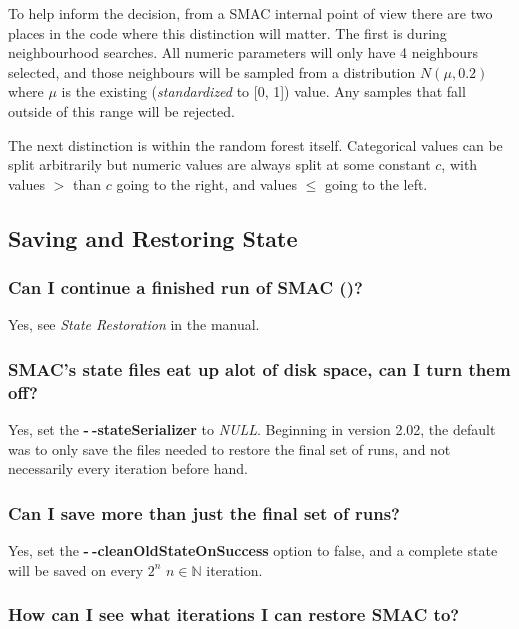\documentclass[11pt,letterpaper,oneside]{article}
\begin{document}
	
	To help inform the decision, from a SMAC internal point of view there are two places in the code where this distinction will matter. The first is during neighbourhood searches. All numeric parameters will only have 4 neighbours selected, and those neighbours will be sampled from a distribution $N(\mu, 0.2)$ where $\mu$ is the existing (\emph{standardized} to [0, 1]) value. Any samples that fall outside of this range will be rejected.
	
	The next distinction is within the random forest itself. Categorical values can be split arbitrarily but numeric values are always split at some constant $c$, with values $>$ than $c$ going to the right, and values $\leq$ going to the left.
		
\subsection{Saving and Restoring State}

\subsubsection{Can I continue a finished run of SMAC ()?}

	Yes, see \emph{State Restoration} in the manual.

\subsubsection{SMAC's state files eat up alot of disk space, can I turn them off?}

	Yes, set the \textbf{-$~\!$-stateSerializer} to \emph{NULL}. Beginning in version 2.02, the default was to only save the files needed to restore the final set of runs, and not necessarily every iteration before hand.
	
\subsubsection{Can I save more than just the final set of runs?}

	Yes, set the \textbf{-$~\!$-cleanOldStateOnSuccess} option to false, and a complete state will be saved on every $2^n$  $n\in\mathbb{N}$ iteration.

\subsubsection{How can I see what iterations I can restore SMAC to?}
\end{document}

